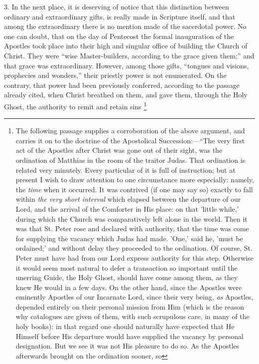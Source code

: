 3. In the next place, it is deserving of notice that this distinction
between ordinary and extraordinary gifts, is really made in Scripture
itself, and that among the extraordinary there is no mention made of the
sacerdotal power. No one can doubt, that on the day of Pentecost the
formal inauguration of the Apostles took place into their high and
singular office of building the Church of Christ. They were ``wise
Master-builders, according to the grace given them;'' and that grace
was extraordinary. However, among those gifts, ``tongues and
visions, prophecies and wonders,'' their priestly power is not
enumerated. On the contrary, that power had been previously conferred,
according to the passage already cited, when Christ breathed on them,
and gave them, through the Holy Ghost, the authority to remit and retain
sins \footnote{The following passage supplies a corroboration
of the above argument, and carries it on to the doctrine of the
Apostolical Succession:—``The very first act of the Apostles after
Christ was gone out of their sight, was the ordination of Matthias in
the room of the traitor Judas. That ordination is related very minutely.
Every particular of it is full of instruction; but at present I wish to
draw attention to one circumstance more especially: namely, the \emph{time}
when it occurred. It was contrived (if one may say so) exactly to fall
within \emph{the very short interval} which elapsed between the
departure of our Lord, and the arrival of the Comforter in His place: on
that 'little while,' during which the Church was comparatively left
alone in the world. Then it was that St. Peter rose and declared with
authority, that the time was come for supplying the vacancy which Judas
had made. 'One,' said he, 'must be ordained;' and without delay they
proceeded to the ordination. Of course, St. Peter must have had from our
Lord express authority for this step. Otherwise it would seem most
natural to defer a transaction so important until the unerring Guide,
the Holy Ghost, should have come among them, as they knew He would in a
few days. On the other hand, since the Apostles were eminently Apostles
of our Incarnate Lord, since their very being, \emph{as} Apostles,
depended entirely on their personal mission from Him (which is the
reason why catalogues are given of them, with such scrupulous care, in
many of the holy books): in that regard one should naturally have
expected that He Himself before His departure would have supplied the
vacancy by personal designation. But we see it was not His pleasure to
do so. As the Apostles afterwards brought on the ordination sooner, so
}
